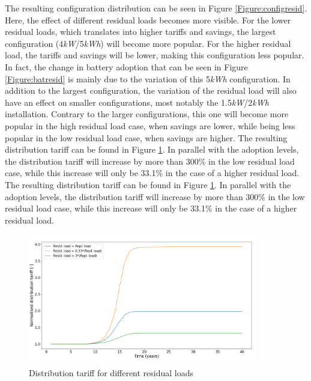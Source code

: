 \noindent
The resulting configuration distribution can be seen in Figure \ref{Figure:configresid}. Here, the effect of different residual loads becomes more visible. For the lower residual loads, which translates into higher tariffs and savings, the largest configuration (4\textit{kW}/5\textit{kWh}) will become more popular. For the higher residual load, the tariffs and savings will be lower, making this configuration less popular. In fact, the change in battery adoption that can be seen in Figure \ref{Figure:batresid} is mainly due to the variation of this 5\textit{kWh} configuration.
In addition to the largest configuration, the variation of the residual load will also have an effect on smaller configurations, most notably the 1.5\textit{kW}/2\textit{kWh} installation. Contrary to the larger configurations, this one will become more popular in the high residual load case, when savings are lower, while being less popular in the low residual load case, when savings are higher. The resulting distribution tariff can be found in Figure \ref{Figure:distresid}. In parallel with the adoption levels, the distribution tariff will increase by more than 300\% in the low residual load case, while this increase will only be 33.1\% in the case of a higher residual load. 
\newline \newline \noindent
The resulting distribution tariff can be found in Figure \ref{Figure:distresid}. In parallel with the adoption levels, the distribution tariff will increase by more than 300\% in the low residual load case, while this increase will only be 33.1\% in the case of a higher residual load.  
\begin{figure}[h!]
\centering
\includegraphics[width=10cm]{ModelAnalysis/distresid.png}
\caption{Distribution tariff for different residual loads}
\label{Figure:distresid}
\end{figure}
\noindent
